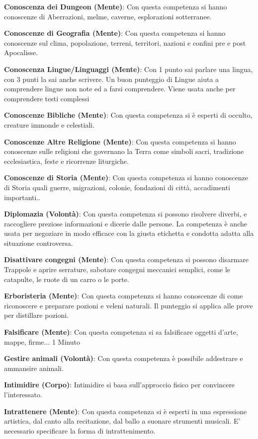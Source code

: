 \documentclass[12pt,a4paper,twoside,openany]{book}
\begin{document}
\begin{multicols}{2}
\textbf{Conoscenza dei Dungeon (Mente)}: Con questa competenza si hanno conoscenze di Aberrazioni, melme, caverne, esplorazioni sotterranee.

\textbf{Conoscenze di Geografia (Mente)}: Con questa competenza si hanno conoscenze sul clima, popolazione, terreni, territori, nazioni e confini pre e post Apocalisse.

\textbf{Conoscenza Lingue/Linguaggi (Mente)}: Con 1 punto sai parlare una lingua, con 3 punti la sai anche scrivere. Un buon punteggio di Lingue aiuta a comprendere lingue non note ed a farsi comprendere. Viene usata anche per comprendere testi complessi

\textbf{Conoscenze Bibliche (Mente)}: Con questa competenza si è esperti di occulto, creature immonde e celestiali. 

\textbf{Conoscenze Altre Religione (Mente)}: Con questa competenza si hanno conoscenze sulle religioni che governano la Terra come simboli sacri, tradizione ecclesiastica, feste e ricorrenze liturgiche. 

\textbf{Conoscenze di Storia (Mente)}: Con questa competenza si hanno conoscenze di Storia quali guerre, migrazioni, colonie, fondazioni di città, accadimenti importanti..

\textbf{Diplomazia (Volontà)}: Con questa competenza si possono risolvere diverbi, e raccogliere preziose informazioni e dicerie dalle persone. La competenza è anche usata per negoziare in modo efficace con la giusta etichetta e condotta adatta alla situazione controversa. 

\textbf{Disattivare congegni (Mente)}: Con questa competenza si possono disarmare Trappole e aprire serrature, sabotare congegni meccanici semplici, come le catapulte, le ruote di un carro o le porte.

\textbf{Erboristeria (Mente)}: Con questa competenza si hanno conoscenze di come riconoscere e preparare pozioni e veleni naturali. Il punteggio si applica alle prove per distillare pozioni.

\textbf{Falsificare (Mente)}: Con questa competenza si sa falsificare oggetti d'arte, mappe, firme... 1 Minuto

\textbf{Gestire animali (Volontà)}: Con questa competenza è possibile addestrare e ammansire animali.

\textbf{Intimidire (Corpo)}: Intimidire si basa sull'approccio fisico per convincere l'interessato. 

\textbf{Intrattenere (Mente)}: Con questa competenza si è esperti in una espressione artistica, dal canto alla recitazione, dal ballo a suonare strumenti musicali. E' necessario specificare la forma di intrattenimento.


\end{multicols}
\end{document}
